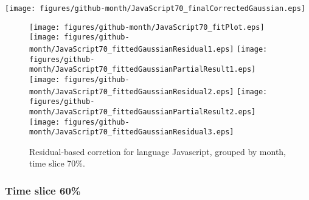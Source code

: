 \begin{center}
{\texttt{[image: figures/github-month/JavaScript70\_finalCorrectedGaussian.eps]}}
\end{center}

\FloatBarrier

\begin{figure}[t]
\centering
{}
{\texttt{[image: figures/github-month/JavaScript70\_fitPlot.eps]}}
{\texttt{[image: figures/github-month/JavaScript70\_fittedGaussianResidual1.eps]}}
{\texttt{[image: figures/github-month/JavaScript70\_fittedGaussianPartialResult1.eps]}}
{\texttt{[image: figures/github-month/JavaScript70\_fittedGaussianResidual2.eps]}}
{\texttt{[image: figures/github-month/JavaScript70\_fittedGaussianPartialResult2.eps]}}
{\texttt{[image: figures/github-month/JavaScript70\_fittedGaussianResidual3.eps]}}
\caption{Residual-based corretion for language Javascript, grouped by month, time slice 70\%.}
\end{figure}


\FloatBarrier


\subsubsection{Time slice 60\%}

